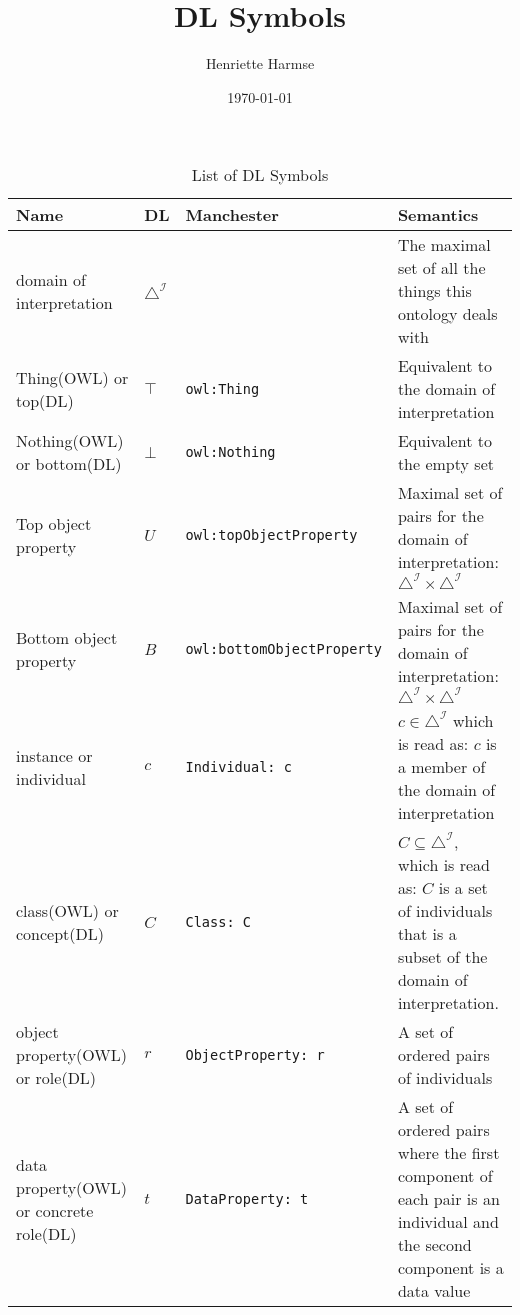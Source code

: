 \documentclass{amsart}
\title{DL Symbols}
\author{Henriette Harmse}
\date{\today}
\begin{document}
  \maketitle
  
\begin{longtable}{|>{\footnotesize}p{2.5cm}|>{\footnotesize}p{1.5cm}|>{\footnotesize}p{3.5cm}|>{\footnotesize}p{5cm}|}
	\caption{List of DL Symbols}
		\label{tab_DLSymbols}\\
			\hline
         	\textbf{Name} & \textbf{DL} & \textbf{Manchester} &  \textbf{Semantics} \\
			\hline  
			domain of interpretation & $\triangle^{\mathcal{I}}$ & & The maximal set of all the things this ontology deals with\\
			\hline
			Thing(OWL) or top(DL) & $\top$ & \texttt{owl:Thing} & Equivalent to the domain of interpretation\\
			\hline
			Nothing(OWL) or bottom(DL) & $\bot$ & \texttt{owl:Nothing} & Equivalent to the empty set\\
			\hline
			Top object property & $U$ & \texttt{owl:topObjectProperty} & Maximal set of pairs for the domain of interpretation: $\triangle^{\mathcal{I}} \times \triangle^{\mathcal{I}}$  \\
			\hline
			Bottom object property & $B$ & \texttt{owl:bottomObjectProperty} & Maximal set of pairs for the domain of interpretation: $\triangle^{\mathcal{I}} \times \triangle^{\mathcal{I}}$  \\
			\hline			
			instance or individual & $c$ & \texttt{Individual: c} & $c \in \triangle^{\mathcal{I}}$ which is read as: $c$ is a member of the domain of interpretation \\
			\hline
			class(OWL) or concept(DL) & $C$ & \texttt{Class: C} & $C \subseteq \triangle^{\mathcal{I}}$, which is read as: $C$ is a set of individuals that is a subset of the domain of interpretation. \\
			\hline
			object property(OWL) or role(DL) & $r$ & \texttt{ObjectProperty: r} & A set of ordered pairs of individuals\\
			\hline
			data property(OWL) or concrete role(DL) & $t$ & \texttt{DataProperty: t} & A set of ordered pairs where the first component of each pair is an individual and the second component is a data value\\
			\hline

\end{longtable}
\end{document}
